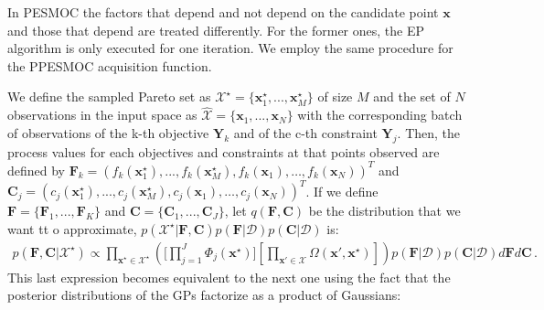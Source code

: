 In PESMOC the factors that depend and not depend on the candidate point $\mathbf{x}$ and those that depend are treated differently. For the former ones, the EP algorithm is only executed for one iteration. We employ the same procedure for the PPESMOC acquisition function.

We define the sampled Pareto set as $\mathcal{X}^\star = \{\boldsymbol{x}^\star_{1},...,\boldsymbol{x}^\star_{M}\}$ of size $M$ and the set of $N$ observations in the input space as $\hat{\mathcal{X}} = \{\boldsymbol{x}_1,...,\boldsymbol{x}_N\}$ with the corresponding batch of observations of the k-th objective $\boldsymbol{Y}_k$ and of the c-th constraint $\boldsymbol{Y}_j$. Then, the process values for each objectives and constraints at that points observed are defined by $\boldsymbol{F}_k = ( f_k(\boldsymbol{x}^{\star}_1), ... , f_k(\boldsymbol{x}^{\star}_M), f_k(\boldsymbol{x}_1),  \ldots,f_k(\boldsymbol{x}_N))^T$ and $\boldsymbol{C}_j = ( c_j(\boldsymbol{x}^{\star}_1), ... , c_j(\boldsymbol{x}^{\star}_M), c_j(\boldsymbol{x}_1), \ldots,c_j(\boldsymbol{x}_N))^T$. If we define $\boldsymbol{F} = \{\boldsymbol{F}_1,...,\boldsymbol{F}_K\}$ and $\boldsymbol{C} = \{\boldsymbol{C}_1,...,\boldsymbol{C}_J\}$, let $q(\boldsymbol{F},\boldsymbol{C})$ be the distribution that we want tt
o approximate, $p(\mathcal{X}^{\star}|\textbf{F},\textbf{C}) p(\textbf{F}|\mathcal{D}) p(\textbf{C}|\mathcal{D})$ is:
\begin{align}
p(\boldsymbol{F},\boldsymbol{C}|\mathcal{X}^\star) \propto \prod_{\textbf{x}^\star\in \mathcal{X}^\star} 
        \left(
        \Bigg[\prod_{j=1}^{J}\Phi_j(\textbf{x}^{\star})\Bigg]
        \left[ 
        \prod_{\textbf{x}'\in \mathcal{X}} 
        \Omega(\textbf{x}',\textbf{x}^{\star})
        \right] 
        \right)
p(\textbf{F}|\mathcal{D}) p(\textbf{C}|\mathcal{D})
 d\textbf{F} d\textbf{C}\,.
\end{align}
This last expression becomes equivalent to the next one using
the fact that the posterior distributions of the GPs factorize
as a product of Gaussians:

